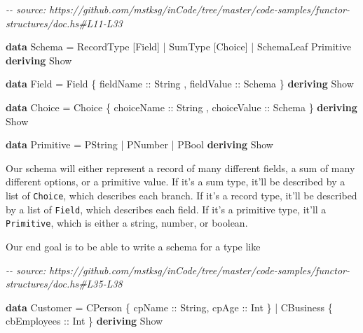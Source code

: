 \documentclass[]{article}
\newenvironment{Shaded}{}{}
\newcommand{\CommentTok}[1]{\textcolor[rgb]{0.38,0.63,0.69}{\textit{#1}}}
\newcommand{\DataTypeTok}[1]{\textcolor[rgb]{0.56,0.13,0.00}{#1}}
\newcommand{\KeywordTok}[1]{\textcolor[rgb]{0.00,0.44,0.13}{\textbf{#1}}}
\newcommand{\NormalTok}[1]{#1}
\newcommand{\OperatorTok}[1]{\textcolor[rgb]{0.40,0.40,0.40}{#1}}
\newcommand{\OtherTok}[1]{\textcolor[rgb]{0.00,0.44,0.13}{#1}}
\begin{document}
\begin{Shaded}
\begin{Highlighting}[]
\CommentTok{{-}{-} source: https://github.com/mstksg/inCode/tree/master/code{-}samples/functor{-}structures/doc.hs\#L11{-}L33}

\KeywordTok{data} \DataTypeTok{Schema} \OtherTok{=}
      \DataTypeTok{RecordType}\NormalTok{  [}\DataTypeTok{Field}\NormalTok{]}
    \OperatorTok{|} \DataTypeTok{SumType}\NormalTok{     [}\DataTypeTok{Choice}\NormalTok{]}
    \OperatorTok{|} \DataTypeTok{SchemaLeaf}  \DataTypeTok{Primitive}
  \KeywordTok{deriving} \DataTypeTok{Show}

\KeywordTok{data} \DataTypeTok{Field} \OtherTok{=} \DataTypeTok{Field}
\NormalTok{    \{}\OtherTok{ fieldName  ::} \DataTypeTok{String}
\NormalTok{    ,}\OtherTok{ fieldValue ::} \DataTypeTok{Schema}
\NormalTok{    \}}
  \KeywordTok{deriving} \DataTypeTok{Show}

\KeywordTok{data} \DataTypeTok{Choice} \OtherTok{=} \DataTypeTok{Choice}
\NormalTok{    \{}\OtherTok{ choiceName  ::} \DataTypeTok{String}
\NormalTok{    ,}\OtherTok{ choiceValue ::} \DataTypeTok{Schema}
\NormalTok{    \}}
  \KeywordTok{deriving} \DataTypeTok{Show}

\KeywordTok{data} \DataTypeTok{Primitive} \OtherTok{=}
      \DataTypeTok{PString}
    \OperatorTok{|} \DataTypeTok{PNumber}
    \OperatorTok{|} \DataTypeTok{PBool}
  \KeywordTok{deriving} \DataTypeTok{Show}
\end{Highlighting}
\end{Shaded}

Our schema will either represent a record of many different fields, a sum of
many different options, or a primitive value. If it's a sum type, it'll be
described by a list of \texttt{Choice}, which describes each branch. If it's a
record type, it'll be described by a list of \texttt{Field}, which describes
each field. If it's a primitive type, it'll a \texttt{Primitive}, which is
either a string, number, or boolean.

Our end goal is to be able to write a schema for a type like

\begin{Shaded}
\begin{Highlighting}[]
\CommentTok{{-}{-} source: https://github.com/mstksg/inCode/tree/master/code{-}samples/functor{-}structures/doc.hs\#L35{-}L38}

\KeywordTok{data} \DataTypeTok{Customer} \OtherTok{=}
      \DataTypeTok{CPerson}\NormalTok{   \{}\OtherTok{ cpName ::} \DataTypeTok{String}\NormalTok{,}\OtherTok{ cpAge ::} \DataTypeTok{Int}\NormalTok{ \}}
    \OperatorTok{|} \DataTypeTok{CBusiness}\NormalTok{ \{}\OtherTok{ cbEmployees ::} \DataTypeTok{Int}\NormalTok{ \}}
  \KeywordTok{deriving} \DataTypeTok{Show}
\end{Highlighting}
\end{Shaded}
\end{document}

